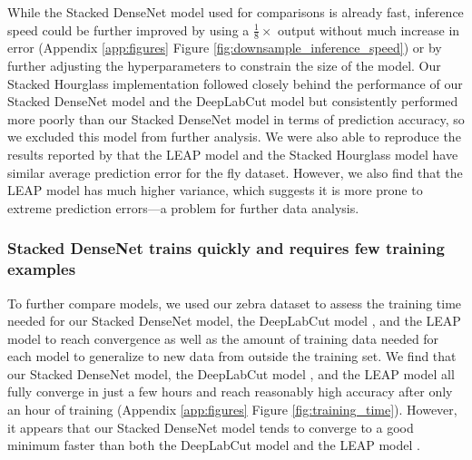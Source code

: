 \documentclass[11pt,a4paper,oneside]{article}
\begin{document}
While the Stacked DenseNet model used for comparisons is already fast, inference speed could be further improved by using a $\tfrac{1}{8}\times$ output without much increase in error (Appendix \ref{app:figures} Figure \ref{fig:downsample_inference_speed}) or by further adjusting the hyperparameters to constrain the size of the model. Our Stacked Hourglass implementation followed closely behind the performance of our Stacked DenseNet model and the DeepLabCut model \citep{mathis2018deeplabcut} but consistently performed more poorly than our Stacked DenseNet model in terms of prediction accuracy, so we excluded this model from further analysis. We were also able to reproduce the results reported by \cite{pereira2019fast} that the LEAP model and the Stacked Hourglass model \citep{newell2016} have similar average prediction error for the fly dataset. However, we also find that the LEAP model \citep{pereira2019fast} has much higher variance, which suggests it is more prone to extreme prediction errors—a problem for further data analysis.

\subsubsection{Stacked DenseNet trains quickly and requires few training examples}
To further compare models, we used our zebra dataset to assess the training time needed for our Stacked DenseNet model, the DeepLabCut model \citep{mathis2018deeplabcut}, and the LEAP model \citep{pereira2019fast} to reach convergence as well as the amount of training data needed for each model to generalize to new data from outside the training set. We find that our Stacked DenseNet model, the DeepLabCut model \citep{mathis2018deeplabcut}, and the LEAP model \citep{pereira2019fast} all fully converge in just a few hours and reach reasonably high accuracy after only an hour of training (Appendix \ref{app:figures} Figure \ref{fig:training_time}). However, it appears that our Stacked DenseNet model tends to converge to a good minimum faster than both the DeepLabCut model \citep{mathis2018deeplabcut} and the LEAP model \citep{pereira2019fast}.
\end{document}
